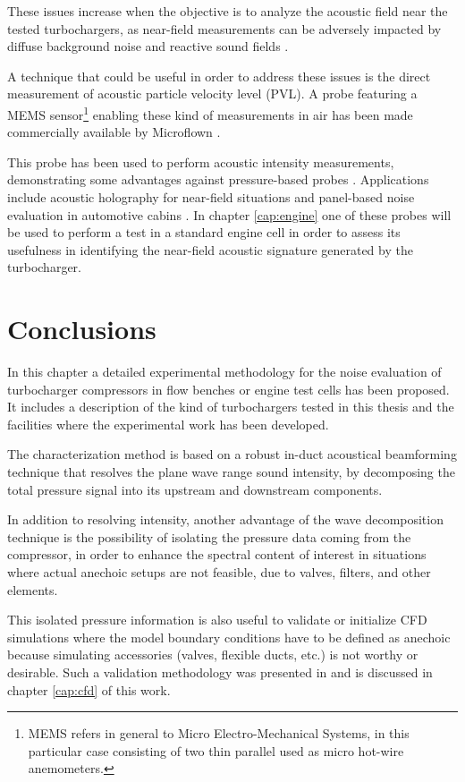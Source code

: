 These issues increase when the objective is to analyze the acoustic field near the tested turbochargers, as near-field measurements can be adversely impacted by diffuse background noise and reactive sound fields \cite{jacobsen1989active,elliot1981errors}. 

A technique that could be useful in order to address these issues is the direct measurement of acoustic particle velocity level (PVL). A probe featuring a MEMS sensor\footnote{MEMS refers in general to Micro Electro-Mechanical Systems, in this particular case consisting of two thin parallel used as micro hot-wire anemometers.} enabling these kind of measurements in air has been made commercially available by Microflown \cite{debree1992micro}. 

This probe has been used to perform acoustic intensity measurements, demonstrating some advantages against pressure-based probes \cite{jacobsen2005comp}. Applications include acoustic holography for near-field situations \cite{comesana2013scan} and panel-based noise evaluation in automotive cabins \cite{Wolff2009PU}. In chapter \ref{cap:engine} one of these probes will be used to perform a test in a standard engine cell in order to assess its usefulness in identifying the near-field acoustic signature generated by the turbocharger.

\section{Conclusions}
\label{sec:conclusions}

In this chapter a detailed experimental methodology for the noise evaluation of turbocharger compressors in flow benches or engine test cells has been proposed. It includes a description of the kind of turbochargers tested in this thesis and the facilities where the experimental work has been developed.

The characterization method is based on a robust in-duct acoustical beamforming technique that resolves the plane wave range sound intensity, by decomposing the total pressure signal into its upstream and downstream components.

In addition to resolving intensity, another advantage of the wave decomposition technique is the possibility of isolating the pressure data coming from the compressor, in order to enhance the spectral content of interest in situations where actual anechoic setups are not feasible, due to valves, filters, and other elements.

This isolated pressure information is also useful to validate or initialize CFD simulations where the model boundary conditions have to be defined as anechoic because simulating accessories (valves, flexible ducts, etc.) is not worthy or desirable. Such a validation methodology was presented in \cite{broatch2014methodology} and is discussed in chapter \ref{cap:cfd} of this work.

